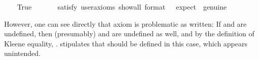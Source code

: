 \begin{isabellebody}
\ \ \isamarkupfalse%
\ True\ \isanewline
\ \ \ \ \isamarkupfalse%
\ {\isacharbrackleft}satisfy{\isacharcomma}\ user{\isacharunderscore}axioms{\isacharcomma}\ show{\isacharunderscore}all{\isacharcomma}\ format\ {\isacharequal}\ {}{\isacharcomma}\ expect\ {\isacharequal}\ genuine{\isacharbrackright}%
\isadelimproof
\ %
\endisadelimproof
%
\isatagproof
{}\isamarkupfalse%
\ %
%
\endisatagproof
{\isafoldproof}%
%
\isadelimproof
%
\endisadelimproof
%
\begin{isamarkuptext}%
However, one can see directly that axiom   is problematic as written:
If   and   are undefined, then (presumably)   and 
 are undefined as well, and by the definition of Kleene equality,
 .  stipulates that   
should be defined in this case, which appears unintended.


\end{isamarkuptext}
\end{isabellebody}
